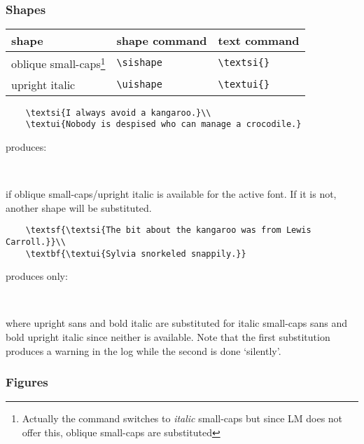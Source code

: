 \documentclass[11pt,british,a4paper]{article}
\begin{document}
\subsubsection{Shapes}

	\begin{longtable}{lll}
		\toprule
		\textbf{shape}		&	\textbf{shape command}	&	\textbf{text command}\\\midrule\endhead
		\bottomrule\endfoot
		oblique small-caps\footnote{Actually the command switches to \emph{italic} small-caps but since LM does not offer this, oblique small-caps are substituted}%
											&	\verb|\sishape|					&	\verb|\textsi{}|\\
		upright italic			&	\verb|\uishape|					&	\verb|\textui{}|\\
	\end{longtable}

\begin{verbatim}
	\textsi{I always avoid a kangaroo.}\\
	\textui{Nobody is despised who can manage a crocodile.}
\end{verbatim}
produces:
\begin{center}
	\\
\end{center}
if oblique small-caps/upright italic is available for the active font. If it is not, another shape will be substituted.
\begin{verbatim}
	\textsf{\textsi{The bit about the kangaroo was from Lewis Carroll.}}\\
	\textbf{\textui{Sylvia snorkeled snappily.}}
\end{verbatim}
produces only:
\begin{center}
	\textsf{}\\
	\textbf{}
\end{center}
where upright sans and bold italic are substituted for italic small-caps sans and bold upright italic since neither is available. Note that the first substitution produces a warning in the log while the second is done ‘silently’.

\subsubsection{Figures}
\end{document}
